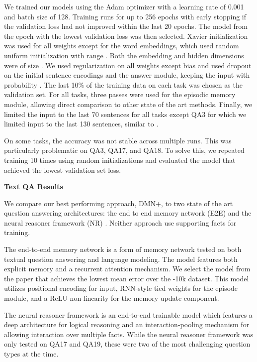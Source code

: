 \documentclass{article}
\begin{document}
We trained our models using the Adam optimizer \cite{kingma2014adam} with a learning rate of 0.001 and batch size of 128.
Training runs for up to 256 epochs with early stopping if the validation loss had not improved within the last 20 epochs.
The model from the epoch with the lowest validation loss was then selected.
Xavier initialization was used for all weights except for the word embeddings, which used random uniform initialization with range .
Both the embedding and hidden dimensions were of size .
We used  regularization on all weights except bias and used dropout on the initial sentence encodings and the answer module, keeping the input with probability .
The last 10\% of the training data on each task was chosen as the validation set.
For all tasks, three passes were used for the episodic memory module, allowing direct comparison to other state of the art methods.
Finally, we limited the input to the last 70 sentences for all tasks except QA3 for which we limited input to the last 130 sentences, similar to \citet{Sukhbaatar2015}.

On some tasks, the accuracy was not stable across multiple runs.
This was particularly problematic on QA3, QA17, and QA18.
To solve this, we repeated training 10 times using random initializations and evaluated the model that achieved the lowest validation set loss.

\textbf{Text QA Results}

We compare our best performing approach, DMN+, to two state of the art question answering architectures: the end to end memory network (E2E) \cite{Sukhbaatar2015} and the neural reasoner framework (NR) \cite{Peng2015}.
Neither approach use supporting facts for training.

The end-to-end memory network is a form of memory network \cite{Weston2015} tested on both textual question answering and language modeling.
The model features both explicit memory and a recurrent attention mechanism.
We select the model from the paper that achieves the lowest mean error over the \babi-10k dataset.
This model utilizes positional encoding for input, RNN-style tied weights for the episode module, and a ReLU non-linearity for the memory update component.

The neural reasoner framework is an end-to-end trainable model which features a deep architecture for logical reasoning and an interaction-pooling mechanism for allowing interaction over
multiple facts.
While the neural reasoner framework was only tested on QA17 and QA19, these were two of the most challenging question types at the time.
\end{document}
